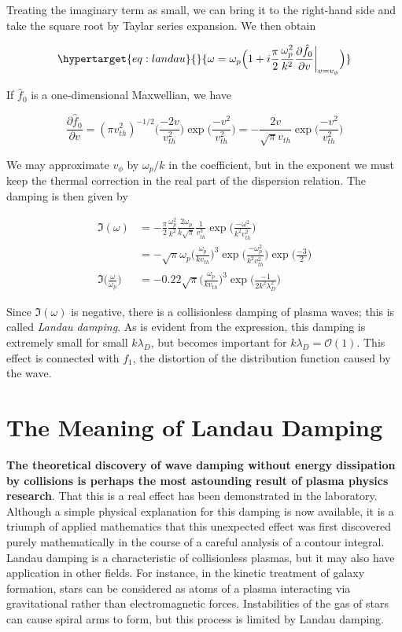 \documentclass[
  notoc %
]{tufte-book}
\begin{document}
Treating the imaginary term as small, we can bring it to the right-hand
side and take the square root by Taylar series expansion. We then obtain

\begin{equation}\protect\hypertarget{eq:landau}{}{
\omega = \omega_p\Big( 1 + i\frac{\pi}{2}\frac{\omega_p^2}{k^2}\frac{\partial\hat{f}_0}{\partial v}\biggr\rvert_{v=v_\phi} \Big)
}\label{eq:landau}\end{equation}

If \(\hat{f}_0\) is a one-dimensional Maxwellian, we have

\[
\frac{\partial\hat{f}_0}{\partial v} = (\pi v_{th}^2)^{-1/2} \Big( \frac{-2v}{v_{th}^2} \Big) \exp\Big( \frac{-v^2}{v_{th}^2} \Big) = -\frac{2v}{\sqrt{\pi}v_{th}}\exp\Big( \frac{-v^2}{v_{th}^2} \Big)
\]

We may approximate \(v_\phi\) by \(\omega_p/k\) in the coefficient, but
in the exponent we must keep the thermal correction in the real part of
the dispersion relation. The damping is then given by

\[
\begin{aligned}
\Im(\omega) &= -\frac{\pi}{2}\frac{\omega_p^2}{k^2}\frac{2\omega_p}{k\sqrt{\pi}}\frac{1}{v_{th}^3}\exp\Big( \frac{-\omega^2}{k^2 v_{th}^2} \Big) \\
&= -\sqrt{\pi}\omega_p \Big( \frac{\omega_p}{kv_{th}} \Big)^3 \exp\Big( \frac{-\omega_p^2}{k^2 v_{th}^2}\Big)\exp\Big( \frac{-3}{2} \Big) \\
\Im\Big(\frac{\omega}{\omega_p}\Big) &= -0.22 \sqrt{\pi}\Big( \frac{\omega_p}{kv_{th}} \Big)^3 \exp\Big( \frac{-1}{2k^2\lambda_D^2} \Big)
\end{aligned}
\]

Since \(\Im(\omega)\) is negative, there is a collisionless damping of
plasma waves; this is called \emph{Landau damping}. As is evident from
the expression, this damping is extremely small for small
\(k\lambda_D\), but becomes important for
\(k\lambda_D = \mathcal{O}(1)\). This effect is connected with \(f_1\),
the distortion of the distribution function caused by the wave.

\hypertarget{sec:landau_damping}{%
\section{The Meaning of Landau Damping}\label{sec:landau_damping}}

\textbf{The theoretical discovery of wave damping without energy
dissipation by collisions is perhaps the most astounding result of
plasma physics research}. That this is a real effect has been
demonstrated in the laboratory. Although a simple physical explanation
for this damping is now available, it is a triumph of applied
mathematics that this unexpected effect was first discovered purely
mathematically in the course of a careful analysis of a contour
integral. Landau damping is a characteristic of collisionless plasmas,
but it may also have application in other fields. For instance, in the
kinetic treatment of galaxy formation, stars can be considered as atoms
of a plasma interacting via gravitational rather than electromagnetic
forces. Instabilities of the gas of stars can cause spiral arms to form,
but this process is limited by Landau damping.
\end{document}
